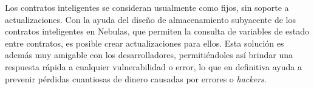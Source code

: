 Los contratos inteligentes se consideran usualmente como fijos, sin soporte a actualizaciones. Con la ayuda del diseño de almacenamiento subyacente de los contratos inteligentes en Nebulas, que permiten la consulta de variables de estado entre contratos, es posible crear actualizaciones para ellos. Esta solución es además muy amigable con los desarrolladores, permitiéndoles así brindar una respuesta rápida a cualquier vulnerabilidad o error, lo que en definitiva ayuda a prevenir pérdidas cuantiosas de dinero causadas por errores o \textit{hackers}.
